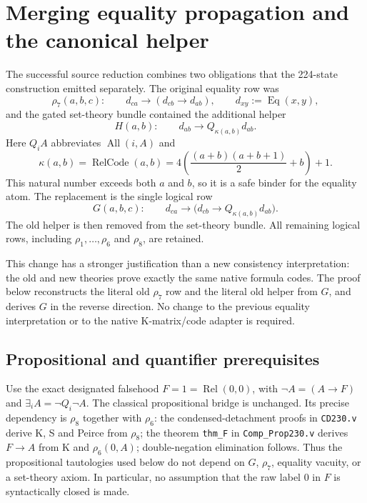 \section{Merging equality propagation and the canonical helper}
\label{sec:merged-equality}

The successful source reduction combines two obligations that the
224-state construction emitted separately.  The original equality row was
\[
 \rho_7(a,b,c):\qquad
 d_{ca}\longrightarrow(d_{cb}\longrightarrow d_{ab}),
 \qquad d_{xy}:=\operatorname{Eq}(x,y),
\]
and the gated set-theory bundle contained the additional helper
\[
 H(a,b):\qquad d_{ab}\longrightarrow Q_{\kappa(a,b)}d_{ab}.
\]
Here $Q_iA$ abbreviates $\operatorname{All}(i,A)$ and
\[
 \kappa(a,b)=\operatorname{RelCode}(a,b)
 =4\left(\frac{(a+b)(a+b+1)}2+b\right)+1.
\]
This natural number exceeds both $a$ and $b$, so it is a safe binder for
the equality atom.  The replacement is the single logical row
\[
 \boxed{\quad
 G(a,b,c):\qquad
 d_{ca}\longrightarrow
       \bigl(d_{cb}\longrightarrow Q_{\kappa(a,b)}d_{ab}\bigr).
 \quad}                                                        \tag{G}
\]
The old helper is then removed from the set-theory bundle.  All remaining
logical rows, including $\rho_1,\ldots,\rho_6$ and $\rho_8$, are retained.

This change has a stronger justification than a new consistency
interpretation: the old and new theories prove exactly the same native
formula codes.  The proof below reconstructs the literal old $\rho_7$
row and the literal old helper from $G$, and derives $G$ in the reverse
direction.  No change to the previous equality interpretation or to the
native K-matrix/code adapter is required.

\subsection{Propositional and quantifier prerequisites}

Use the exact designated falsehood $F=1=\operatorname{Rel}(0,0)$, with
$\neg A=(A\to F)$ and $\exists_iA=\neg Q_i\neg A$.
The classical propositional bridge is unchanged.  Its precise dependency
is $\rho_8$ together with $\rho_6$: the condensed-detachment proofs in
\texttt{CD230.v} derive K, S and Peirce from $\rho_8$; the theorem
\texttt{thm\_F} in \texttt{Comp\_Prop230.v} derives $F\to A$ from K and
$\rho_6(0,A)$; double-negation elimination follows.  Thus the
propositional tautologies used below do not depend on $G$, $\rho_7$,
equality vacuity, or a set-theory axiom.  In particular, no assumption that
the raw label 0 in $F$ is syntactically closed is made.

